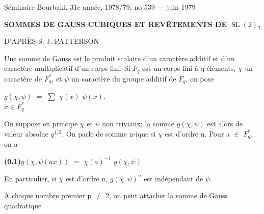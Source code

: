\documentclass[10pt,a4paper]{article}
\begin{document}
\fontsize{7.35pt}{8.45pt}\selectfont


\label{d035-physical-001}

\begin{center}
{\small S\'eminaire Bourbaki, 31e ann\'ee, 1978/79, no 539 --- juin 1979}\par
\vspace{0.55em}
{\Large\bfseries SOMMES DE GAUSS CUBIQUES ET REV\^ETEMENTS DE $\operatorname{SL}(2)$,\par
D'APR\`ES S. J. PATTERSON}\par
{}\par
\end{center}
\par\medskip{}\par\smallskip
\par Une somme de Gauss est le produit scalaire d'un caractère additif et d'un caractère multiplicatif d'un corps fini. Si $F_q$ est un corps fini à q éléments, $\chi{}$ un caractère de $F_q^*$, et $\psi{}$ un caractère du groupe additif de $F_q$, on pose\par
\par\smallskip\begin{center}\begin{minipage}{0.96\textwidth}\centering
$g(\chi{},\psi{})$ $=$ $\sum{}$ $\chi{}(x)$ $\psi{}(x)$. \\ $x\in{}F_q^*$
\end{minipage}\end{center}\smallskip
\par On suppose en principe $\chi{}$ et $\psi{}$ non triviaux; la somme $g(\chi{},\psi{})$ est alors de valeur absolue $q^{1/2}$. On parle de somme n-ique si $\chi{}$ est d'ordre n. Pour a $\in{}$ $F_q^*$, on a\par
\par\noindent\textbf{(0.1)}\quad $g(\chi{},\psi{}(ax))$ $=$ $\chi{}(a)^{-1}$ $g(\chi{},\psi{})$\par
\par En particulier, si $\chi{}$ est d'ordre n, $g(\chi{},\psi{})^n$ est indépendant de $\psi{}$.\par
\par A chaque nombre premier p $\ne{}$ 2, on peut attacher la somme de Gauss quadratique\par
\end{document}

